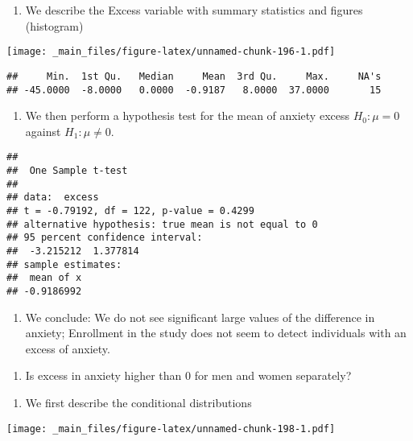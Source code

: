 \documentclass[
]{book}
\providecommand{\tightlist}{%
  \setlength{\itemsep}{0pt}\setlength{\parskip}{0pt}}
\begin{document}
\begin{enumerate}
\def\labelenumi{\alph{enumi}.}
\tightlist
\item
  We describe the Excess variable with summary statistics and figures (histogram)
\end{enumerate}

\texttt{[image: \_main\_files/figure-latex/unnamed-chunk-196-1.pdf]}

\begin{verbatim}
##     Min.  1st Qu.   Median     Mean  3rd Qu.     Max.     NA's 
## -45.0000  -8.0000   0.0000  -0.9187   8.0000  37.0000       15
\end{verbatim}

\begin{enumerate}
\def\labelenumi{\alph{enumi}.}
\setcounter{enumi}{1}
\tightlist
\item
  We then perform a hypothesis test for the mean of anxiety excess \(H_0:\mu=0\) against \(H_1:\mu \neq 0\).
\end{enumerate}

\begin{verbatim}
## 
##  One Sample t-test
## 
## data:  excess
## t = -0.79192, df = 122, p-value = 0.4299
## alternative hypothesis: true mean is not equal to 0
## 95 percent confidence interval:
##  -3.215212  1.377814
## sample estimates:
##  mean of x 
## -0.9186992
\end{verbatim}

\begin{enumerate}
\def\labelenumi{\alph{enumi}.}
\setcounter{enumi}{2}
\tightlist
\item
  We conclude: We do not see significant large values of the difference in anxiety; Enrollment in the study does not seem to detect individuals with an excess of anxiety.
\end{enumerate}

\begin{enumerate}
\def\labelenumi{\arabic{enumi}.}
\setcounter{enumi}{1}
\tightlist
\item
  Is excess in anxiety higher than \(0\) for men and women separately?
\end{enumerate}

\begin{enumerate}
\def\labelenumi{\alph{enumi}.}
\tightlist
\item
  We first describe the conditional distributions
\end{enumerate}

\texttt{[image: \_main\_files/figure-latex/unnamed-chunk-198-1.pdf]}
\end{document}

